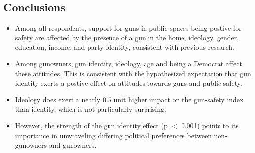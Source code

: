 \documentclass[a0,landscape]{a0poster}
\begin{document}
\begin{multicols}{4}
\color{SaddleBrown} %

\section*{Conclusions}
\large
\begin{itemize}
\item Among all respondents, support for guns in public spaces being postive for safety are affected by the presence of a gun in the home, ideology, gender, education, income, and party identity, consistent with previous research.
\item Among gunowners, gun identity, ideology, age and being a Democrat affect these attitudes. This is consistent with the hypothesized expectation that gun identity exerts a postive effect on attitudes towards guns and public safety.
\item Ideology does exert a nearly 0.5 unit higher impact on the gun-safety index than identity, which is not particularly surprising.
\item However, the strength of the gun identity effect (p $<$ 0.001) points to its importance in unwraveling differing political preferences between non-gunowners and gunowners.
\end{itemize}

\color{DarkSlateGray} %




\end{multicols}
\end{document}

